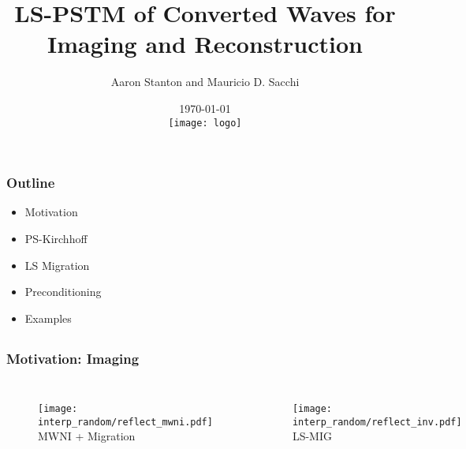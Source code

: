 \title[Short title]{LS-PSTM of Converted Waves for Imaging and Reconstruction}
\author{\small Aaron Stanton and Mauricio D. Sacchi}
\date{\small \today \\ \vspace{0.5cm}   \texttt{[image: logo]}}


\maketitle

\begin{frame}
\frametitle{Outline}
  \begin{itemize}
  \item Motivation
  \item PS-Kirchhoff
  \item LS Migration
  \item Preconditioning
  \item Examples
  \end{itemize}
\end{frame}

\begin{frame}
\section[Motivation]{}
\frametitle{Motivation: Imaging}
\begin{columns}[c]
\column{2in} 
	\begin{figure} 
	\texttt{[image: interp\_random/reflect\_mwni.pdf]} \\ 
	\tiny MWNI + Migration
	\end{figure} 
\column{2in}
	\begin{figure} 
	\texttt{[image: interp\_random/reflect\_inv.pdf]} \\
	\tiny LS-MIG
	\end{figure}
\end{columns}
\end{frame}

